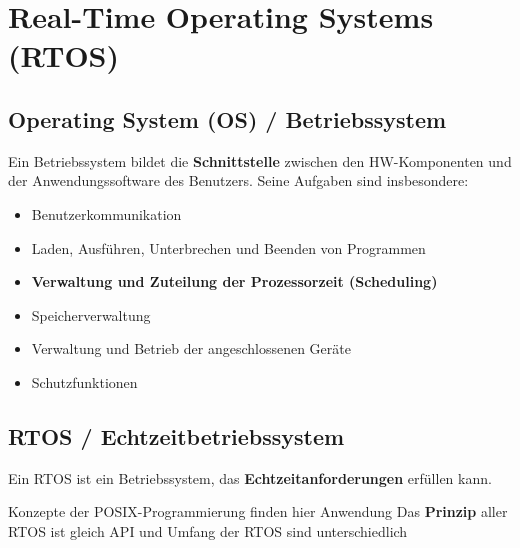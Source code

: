 \section{Real-Time Operating Systems (RTOS)}

\subsection{Operating System (OS) / Betriebssystem}

Ein Betriebssystem bildet die \textbf{Schnittstelle} zwischen den HW-Komponenten und der Anwendungssoftware des Benutzers.
Seine Aufgaben sind insbesondere:

\vspace{0.1cm}

\begin{minipage}[t]{0.58\columnwidth}
    \raggedright
    \begin{itemize}
        \item Benutzerkommunikation
        \item Laden, Ausführen, Unterbrechen und Beenden von Programmen
        \item \textbf{Verwaltung und Zuteilung der Prozessorzeit (Scheduling)}
    \end{itemize}
\end{minipage}
\hfill
\begin{minipage}[t]{0.38\columnwidth}
    \raggedright
    \begin{itemize}
        \item Speicherverwaltung
        \item Verwaltung und Betrieb der angeschlossenen Geräte
        \item Schutzfunktionen
    \end{itemize}
\end{minipage}


\subsection{RTOS / Echtzeitbetriebssystem}

Ein RTOS ist ein Betriebssystem, das \textbf{Echtzeitanforderungen} erfüllen kann.

\vspace{0.1cm}

\begin{outline}
    \1 Konzepte der POSIX-Programmierung finden hier Anwendung
    \1 Das \textbf{Prinzip} aller RTOS ist gleich
        \2 API und Umfang der RTOS sind unterschiedlich
\end{outline}



